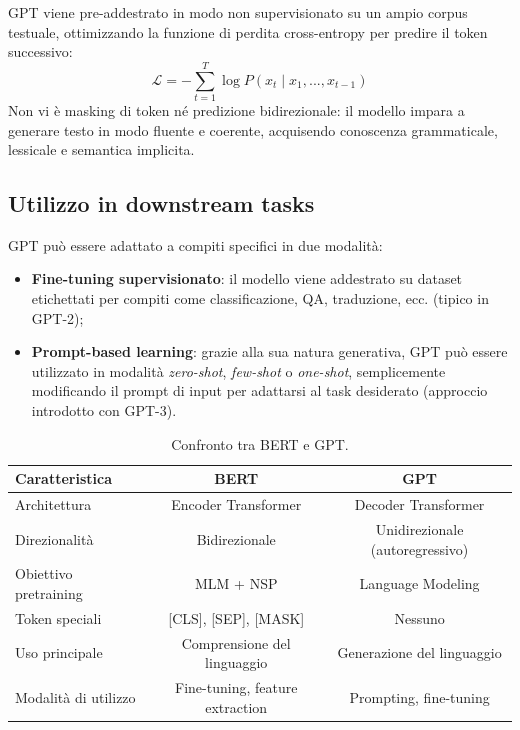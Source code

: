GPT viene pre-addestrato in modo non supervisionato su un ampio corpus testuale, ottimizzando la funzione di perdita cross-entropy per predire il token successivo:
\[
\mathcal{L} = -\sum_{t=1}^{T} \log P(x_t \mid x_1, ..., x_{t-1})
\]
Non vi è masking di token né predizione bidirezionale: il modello impara a generare testo in modo fluente e coerente, acquisendo conoscenza grammaticale, lessicale e semantica implicita.

\subsection{Utilizzo in downstream tasks}

GPT può essere adattato a compiti specifici in due modalità:

\begin{itemize}
    \item \textbf{Fine-tuning supervisionato}: il modello viene addestrato su dataset etichettati per compiti come classificazione, QA, traduzione, ecc. (tipico in GPT-2);
    \item \textbf{Prompt-based learning}: grazie alla sua natura generativa, GPT può essere utilizzato in modalità \textit{zero-shot}, \textit{few-shot} o \textit{one-shot}, semplicemente modificando il prompt di input per adattarsi al task desiderato (approccio introdotto con GPT-3).
\end{itemize}

\begin{table}
    \centering
    \caption{Confronto tra BERT e GPT.}
    \begin{adjustbox}{width=\textwidth}
    \begin{tabular}{|l|c|c|}
    \hline
    \textbf{Caratteristica} & \textbf{BERT} & \textbf{GPT} \\
    \hline
    Architettura & Encoder Transformer & Decoder Transformer \\
    Direzionalità & Bidirezionale & Unidirezionale (autoregressivo) \\
    Obiettivo pretraining & MLM + NSP & Language Modeling \\
    Token speciali & [CLS], [SEP], [MASK] & Nessuno \\
    Uso principale & Comprensione del linguaggio & Generazione del linguaggio \\
    Modalità di utilizzo & Fine-tuning, feature extraction & Prompting, fine-tuning \\
    \hline
    \end{tabular}
    \end{adjustbox}
\end{table}
